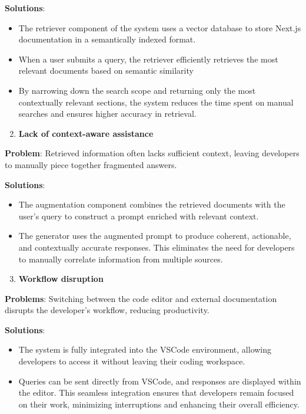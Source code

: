 \textbf{Solutions}:
\begin{itemize}
  \item The retriever component of the system uses a vector database to store Next.js documentation in a semantically indexed format.
  \item When a user submits a query, the retriever efficiently retrieves the most relevant documents based on semantic similarity
  \item By narrowing down the search scope and returning only the most contextually relevant sections, the system reduces the time spent on manual searches and ensures higher accuracy in retrieval.
\end{itemize}

\begin{enumerate}
  \setcounter{enumi}{1}
  \item \textbf{Lack of context-aware assistance}
\end{enumerate}

\textbf{Problem}: Retrieved information often lacks sufficient context, leaving developers to manually piece together fragmented answers.
\vspace{2mm}

\textbf{Solutions}:
\begin{itemize}
  \item The augmentation component combines the retrieved documents with the user's query to construct a prompt enriched with relevant context.
  \item The generator uses the augmented prompt to produce coherent, actionable, and contextually accurate responses. This eliminates the need for developers to manually correlate information from multiple sources.
\end{itemize}

\begin{enumerate}
  \setcounter{enumi}{2}
  \item \textbf{Workflow disruption}
\end{enumerate}

\textbf{Problems}: Switching between the code editor and external documentation disrupts the developer's workflow, reducing productivity.
\vspace{2mm}

\textbf{Solutions}:
\begin{itemize}
  \item The system is fully integrated into the VSCode environment, allowing developers to access it without leaving their coding workspace.
  \item Queries can be sent directly from VSCode, and responses are displayed within the editor. This seamless integration ensures that developers remain focused on their work, minimizing interruptions and enhancing their overall efficiency.
\end{itemize}

